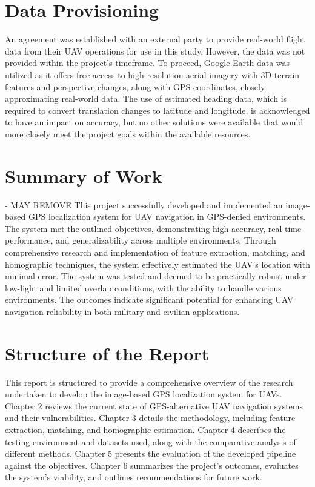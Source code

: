 \section{Data Provisioning}

An agreement was established with an external party to provide real-world flight data from their UAV operations for use in this study. However, the data was not provided within the project's timeframe. To proceed, Google Earth data was utilized as it offers free access to high-resolution aerial imagery with 3D terrain features and perspective changes, along with GPS coordinates, closely approximating real-world data. The use of estimated heading data, which is required to convert translation changes to latitude and longitude, is acknowledged to have an impact on accuracy, but no other solutions were available that would more closely meet the project goals within the available resources.



\section{Summary of Work} - MAY REMOVE
This project successfully developed and implemented an image-based GPS localization system for UAV navigation in GPS-denied environments. The system met the outlined objectives, demonstrating high accuracy, real-time performance, and generalizability across multiple environments. Through comprehensive research and implementation of feature extraction, matching, and homographic techniques, the system effectively estimated the UAV's location with minimal error. The system was tested and deemed to be practically robust under low-light and limited overlap conditions, with the ability to handle various environments. The outcomes indicate significant potential for enhancing UAV navigation reliability in both military and civilian applications.


\section{Structure of the Report}
This report is structured to provide a comprehensive overview of the research undertaken to develop the image-based GPS localization system for UAVs. Chapter 2 reviews the current state of GPS-alternative UAV navigation systems and their vulnerabilities. Chapter 3 details the methodology, including feature extraction, matching, and homographic estimation. Chapter 4 describes the testing environment and datasets used, along with the comparative analysis of different methods. Chapter 5 presents the evaluation of the developed pipeline against the objectives. Chapter 6 summarizes the project's outcomes, evaluates the system's viability, and outlines recommendations for future work.




